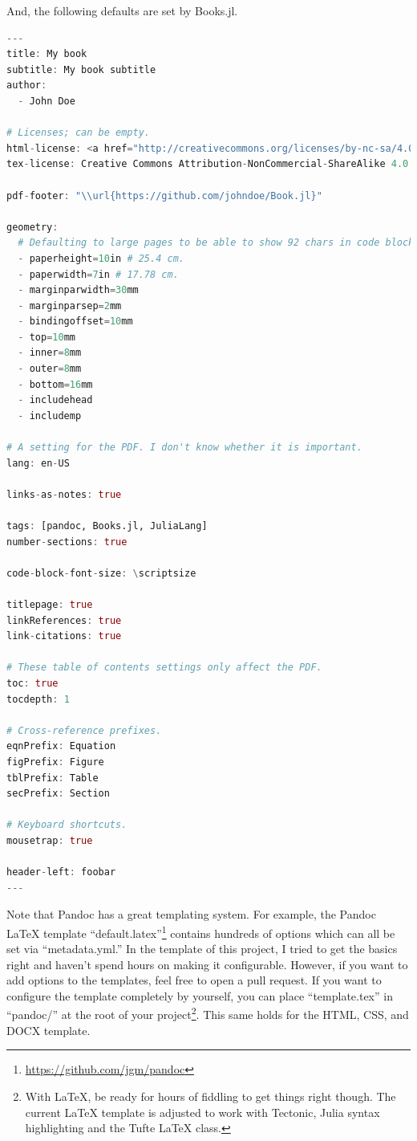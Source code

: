 \documentclass[
  notoc %
]{tufte-book}
\DeclareRobustCommand{\href}[2]{#2\footnote{\url{#1}}}
\begin{document}
And, the following defaults are set by Books.jl.

\begin{lstlisting}[language=Julia]
---
title: My book
subtitle: My book subtitle
author:
  - John Doe

# Licenses; can be empty.
html-license: <a href="http://creativecommons.org/licenses/by-nc-sa/4.0/">CC BY-NC-SA 4.0</a>
tex-license: Creative Commons Attribution-NonCommercial-ShareAlike 4.0 International

pdf-footer: "\\url{https://github.com/johndoe/Book.jl}"

geometry:
  # Defaulting to large pages to be able to show 92 chars in code blocks.
  - paperheight=10in # 25.4 cm.
  - paperwidth=7in # 17.78 cm.
  - marginparwidth=30mm
  - marginparsep=2mm
  - bindingoffset=10mm
  - top=10mm
  - inner=8mm
  - outer=8mm
  - bottom=16mm
  - includehead
  - includemp

# A setting for the PDF. I don't know whether it is important.
lang: en-US

links-as-notes: true

tags: [pandoc, Books.jl, JuliaLang]
number-sections: true

code-block-font-size: \scriptsize

titlepage: true
linkReferences: true
link-citations: true

# These table of contents settings only affect the PDF.
toc: true
tocdepth: 1

# Cross-reference prefixes.
eqnPrefix: Equation
figPrefix: Figure
tblPrefix: Table
secPrefix: Section

# Keyboard shortcuts.
mousetrap: true

header-left: foobar
---

\end{lstlisting}

Note that Pandoc has a great templating system. For example, the
\href{https://github.com/jgm/pandoc}{Pandoc LaTeX template
``default.latex''} contains hundreds of options which can all be set via
``metadata.yml.'' In the template of this project, I tried to get the
basics right and haven't spend hours on making it configurable. However,
if you want to add options to the templates, feel free to open a pull
request. If you want to configure the template completely by yourself,
you can place ``template.tex'' in ``pandoc/'' at the root of your
project\footnote{With LaTeX, be ready for hours of fiddling to get
  things right though. The current LaTeX template is adjusted to work
  with Tectonic, Julia syntax highlighting and the Tufte LaTeX class.}.
This same holds for the HTML, CSS, and DOCX template.
\end{document}
